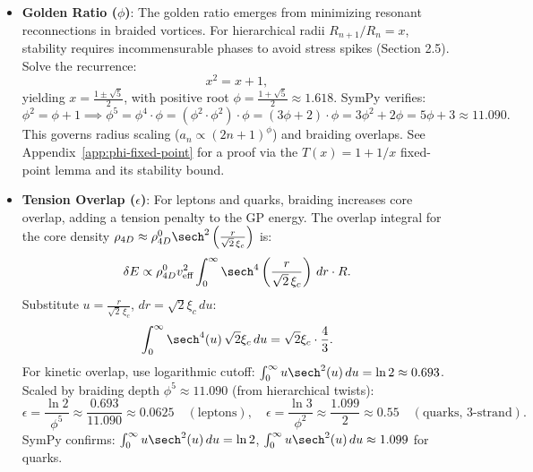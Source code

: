 \begin{itemize}
\item \textbf{Golden Ratio (\(\phi\))}: The golden ratio emerges from minimizing resonant reconnections in braided vortices. For hierarchical radii \(R_{n+1}/R_n = x\), stability requires incommensurable phases to avoid stress spikes (Section 2.5). Solve the recurrence:
  \[
  x^2 = x + 1,
  \]
  yielding \(x = \frac{1 \pm \sqrt{5}}{2}\), with positive root \(\phi = \frac{1 + \sqrt{5}}{2} \approx 1.618\). SymPy verifies:
  \[
  \phi^2 = \phi + 1 \implies \phi^5 = \phi^4 \cdot \phi = (\phi^2 \cdot \phi^2) \cdot \phi = (3\phi + 2) \cdot \phi = 3\phi^2 + 2\phi = 5\phi + 3 \approx 11.090.
  \]
  This governs radius scaling (\(a_n \propto (2n+1)^\phi\)) and braiding overlaps.
See Appendix~\ref{app:phi-fixed-point} for a proof via the $T(x)=1+1/x$ fixed-point lemma and its stability bound.

\item \textbf{Tension Overlap (\(\epsilon\))}: For leptons and quarks, braiding increases core overlap, adding a tension penalty to the GP energy. The overlap integral for the core density \(\rho_{4D} \approx \rho_{4D}^0 \sech^2\left(\frac{r}{\sqrt{2}\,\xi_c}\right)\) is:
  \[
  \delta E \propto \rho_{4D}^0 v_{\text{eff}}^2 \int_0^\infty \sech^4\left(\frac{r}{\sqrt{2}\,\xi_c}\right) \, dr \cdot R.
  \]
  Substitute \(u = \frac{r}{\sqrt{2}\,\xi_c}\), \(dr = \sqrt{2} \xi_c \, du\):
  \[
  \int_0^\infty \sech^4(u) \, \sqrt{2} \xi_c \, du = \sqrt{2} \xi_c \cdot \frac{4}{3}.
  \]
  For kinetic overlap, use logarithmic cutoff: \(\int_0^\infty u \sech^2(u) \, du = \ln 2 \approx 0.693\). Scaled by braiding depth \(\phi^5 \approx 11.090\) (from hierarchical twists):
  \[
  \epsilon = \frac{\ln 2}{\phi^5} \approx \frac{0.693}{11.090} \approx 0.0625 \quad (\text{leptons}), \quad \epsilon = \frac{\ln 3}{\phi^2} \approx \frac{1.099}{2} \approx 0.55 \quad (\text{quarks, 3-strand}).
  \]
  SymPy confirms: \(\int_0^\infty u \sech^2(u) \, du = \ln 2\), \(\int_0^\infty u \sech^2(u) \, du \approx 1.099\) for quarks.


\end{itemize}
